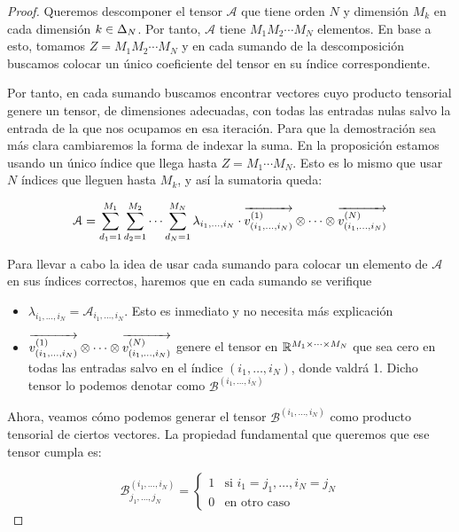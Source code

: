 \begin{proof}
	Queremos descomponer el tensor $\mathcal{A}$ que tiene orden $N$ y dimensión $M_k$ en cada dimensión $k \in \Delta_{N}$. Por tanto, $\mathcal{A}$ tiene $M_1 M_2 \cdots M_N$ elementos. En base a esto, tomamos $Z = M_1 M_2 \cdots M_N$ y en cada sumando de la descomposición buscamos colocar un único coeficiente del tensor en su índice correspondiente.

	Por tanto, en cada sumando buscamos encontrar vectores cuyo producto tensorial genere un tensor, de dimensiones adecuadas, con todas las entradas nulas salvo la entrada de la que nos ocupamos en esa iteración. Para que la demostración sea más clara cambiaremos la forma de indexar la suma. En la proposición estamos usando un único índice que llega hasta $Z = M_1 \cdots M_N$. Esto es lo mismo que usar $N$ índices que lleguen hasta $M_k$, y así la sumatoria queda:

	\begin{equation}
		\mathcal{A} = \sum_{d_1 = 1}^{M_1} \sum_{d_2 = 1}^{M_2} \cdots \sum_{d_N = 1}^{M_N} \lambda_{i_1, \ldots, i_N} \cdot \overrightarrow{v_{(i_1, \ldots, i_N)}^{(1)}} \otimes \cdots \otimes \overrightarrow{v_{(i_1, \ldots, i_N)}^{(N)}}
	\end{equation}

	Para llevar a cabo la idea de usar cada sumando para colocar un elemento de $\mathcal{A}$ en sus índices correctos, haremos que en cada sumando se verifique

	\begin{itemize}
		\item $\lambda_{i_1, \ldots, i_N} = \mathcal{A}_{i_1, \ldots, i_N}$. Esto es inmediato y no necesita más explicación
		\item $\overrightarrow{v_{(i_1, \ldots, i_N)}^{(1)}} \otimes \cdots \otimes \overrightarrow{v_{(i_1, \ldots, i_N)}^{(N)}}$ genere el tensor en $\mathbb{R}^{M_1 \times \cdots \times M_N}$ que sea cero en todas las entradas salvo en el índice $(i_1, \ldots, i_N)$, donde valdrá 1. Dicho tensor lo podemos denotar como  $\mathcal{B}^{(i_1, \ldots, i_N)}$
	\end{itemize}

	Ahora, veamos cómo podemos generar el tensor $\mathcal{B}^{(i_1, \ldots, i_N)}$ como producto tensorial de ciertos vectores. La propiedad fundamental que queremos que ese tensor cumpla es:

	\begin{equation}
		\mathcal{B}^{(i_1, \ldots, i_N)}_{j_1, \ldots, j_N} =
		\begin{cases}
			1 & \text{si } i_1 = j_1, \ldots, i_N = j_N \\
			0 & \text{en otro caso}
		\end{cases}
	\end{equation}


\end{proof}
